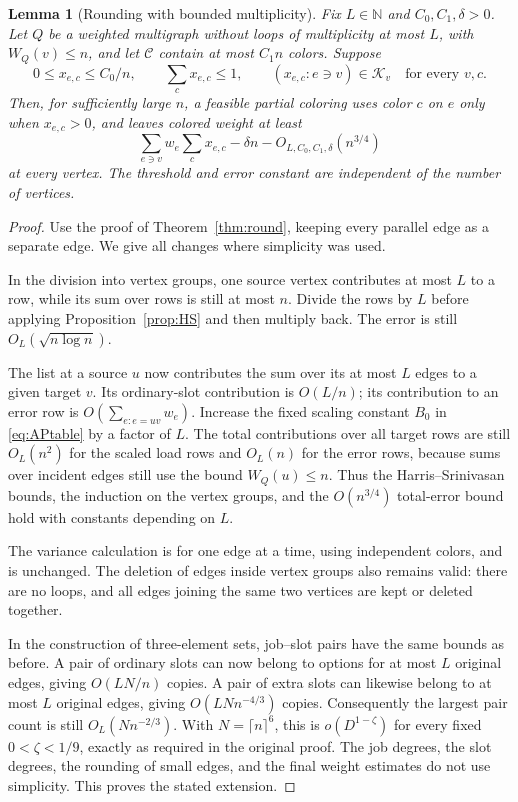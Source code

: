 \documentclass[11pt]{article}
\newtheorem{lemma}[theorem]{Lemma}
\theoremstyle{definition}\newtheorem{algorithm}{Algorithm}[section]
\numberwithin{equation}{section}
\theoremstyle{remark}\newtheorem*{remark}{Remark}
\begin{document}
\begin{lemma}[Rounding with bounded multiplicity]\label{lem:bp-mult-round}
Fix $L\in\mathbb N$ and $C_0,C_1,\delta>0$. Let $Q$ be a weighted multigraph without loops of multiplicity at most $L$, with $W_Q(v)\le n$,
and let $\mathcal C$ contain at most $C_1n$ colors. Suppose
\[
 0\le x_{e,c}\le C_0/n,\qquad \sum_cx_{e,c}\le1,
 \qquad (x_{e,c}:e\ni v)\in\mathcal K_v
 \quad\text{for every }v,c.
\]
Then, for sufficiently large $n$, a feasible partial coloring uses
color $c$ on $e$ only when $x_{e,c}>0$, and leaves colored weight at
least
\[
 \sum_{e\ni v}w_e\sum_cx_{e,c}
 -\delta n-O_{L,C_0,C_1,\delta}(n^{3/4})
\]
at every vertex. The threshold and error constant are independent of
the number of vertices.
\end{lemma}
\begin{proof}
Use the proof of Theorem~\ref{thm:round}, keeping every parallel edge
as a separate edge. We give all changes where simplicity was used.

In the division into vertex groups, one source vertex contributes at
most $L$ to a row, while its sum over rows is still at most $n$.
Divide the rows by $L$ before applying Proposition~\ref{prop:HS} and
then multiply back. The error is still
$O_L(\sqrt{n\log n})$.

The list at a source $u$ now contributes the sum over its at most $L$
edges to a given target $v$. Its ordinary-slot contribution is
$O(L/n)$; its contribution to an error row is
$O(\sum_{e: e=uv}w_e)$. Increase the fixed scaling constant $B_0$ in
\eqref{eq:APtable} by a factor of $L$. The total contributions over
all target rows are still $O_L(n^2)$ for the scaled load rows and
$O_L(n)$ for the error rows, because sums over incident edges still
use the bound $W_Q(u)\le n$. Thus the Harris--Srinivasan bounds,
the induction on the vertex groups, and the $O(n^{3/4})$ total-error
bound hold with constants depending on $L$.

The variance calculation is for one edge at a time, using independent
colors, and is unchanged. The deletion of edges inside vertex groups
also remains valid: there are no loops, and all edges joining the same
two vertices are kept or deleted together.

In the construction of three-element sets, job--slot pairs have the
same bounds as before. A pair of ordinary slots can now belong to
options for at most $L$ original edges, giving $O(LN/n)$ copies.
A pair of extra slots can likewise belong to at most $L$ original
edges, giving $O(LNn^{-4/3})$ copies. Consequently the largest pair
count is still $O_L(Nn^{-2/3})$. With $N=\lceil n\rceil^6$, this is
$o(D^{1-\zeta})$ for every fixed $0<\zeta<1/9$, exactly as required
in the original proof. The job degrees, the slot degrees, the rounding
of small edges, and the final weight estimates do not use simplicity.
This proves the stated extension.
\end{proof}
\end{document}
